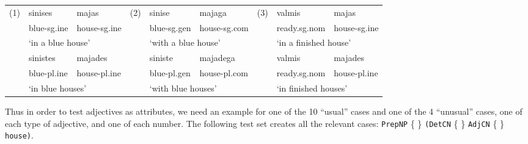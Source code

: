\documentclass[11pt]{article}
\def\t#1{\texttt{#1}}
\begin{document}
\begin{table}[h]
\small
\begin{tabular}{cllcllcll}
(1) & sinises & majas & (2) & sinise & majaga & (3) & valmis & majas \\
& blue-{\sc sg.ine} & house-{\sc sg.ine} &  & blue-{\sc sg.gen} & house-{\sc sg.com} &  & ready.{\sc sg.nom} & house-{\sc sg.ine} \\
& \multicolumn{2}{l}{`in a blue house'} &  & \multicolumn{2}{l}{`with a blue house'} &  & \multicolumn{2}{l}{`in a finished house'} \\
& sinistes & majades &  & siniste & majadega &  & valmis & majades \\
& blue-{\sc pl.ine} & house-{\sc pl.ine} &  & blue-{\sc pl.gen} & house-{\sc pl.com} &  & ready.{\sc sg.nom} & house-{\sc pl.ine} \\
& \multicolumn{2}{l}{`in blue houses'} &  & \multicolumn{2}{l}{`with blue
                                         houses'} &  &
                                                     \multicolumn{2}{l}{`in finished houses'}

\end{tabular}
\end{table}



\noindent Thus in order to test adjectives as attributes, we need an example for
one of the 10 ``usual'' cases and one of the 4 ``unusual'' cases, one
of each type of adjective, and one of each number.  
The following test set creates all the relevant cases: 
 \t{PrepNP} \{  \}
             {\tt (DetCN} \{  \} 
             {\tt AdjCN}  \{ \} 
             {\tt house)}.
\end{document}
